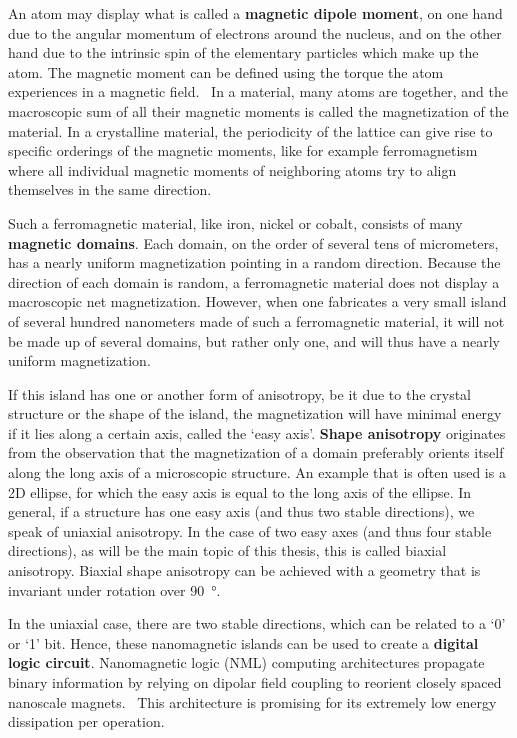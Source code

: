 \documentclass[12pt,a4paper]{article}
\begin{document}
\noindent An atom may display what is called a \textbf{magnetic dipole moment}, on one hand due to the angular momentum of electrons around the nucleus, and on the other hand due to the intrinsic spin of the elementary particles which make up the atom. The magnetic moment can be defined using the torque the atom experiences in a magnetic field.~\cite{IntroMagneticMaterials} In a material, many atoms are together, and the macroscopic sum of all their magnetic moments is called the magnetization of the material. In a crystalline material, the periodicity of the lattice can give rise to specific orderings of the magnetic moments, like for example ferromagnetism where all individual magnetic moments of neighboring atoms try to align themselves in the same direction. \par 
Such a ferromagnetic material, like iron, nickel or cobalt, consists of many \textbf{magnetic domains}. Each domain, on the order of several tens of micrometers, has a nearly uniform magnetization pointing in a random direction. Because the direction of each domain is random, a ferromagnetic material does not display a macroscopic net magnetization. However, when one fabricates a very small island of several hundred nanometers made of such a ferromagnetic material, it will not be made up of several domains, but rather only one, and will thus have a nearly uniform magnetization. \par
If this island has one or another form of anisotropy, be it due to the crystal structure or the shape of the island, the magnetization will have minimal energy if it lies along a certain axis, called the `easy axis'. \textbf{Shape anisotropy} originates from the observation that the magnetization of a domain preferably orients itself along the long axis of a microscopic structure. An example that is often used is a 2D ellipse, for which the easy axis is equal to the long axis of the ellipse. In general, if a structure has one easy axis (and thus two stable directions), we speak of uniaxial anisotropy. In the case of two easy axes (and thus four stable directions), as will be the main topic of this thesis, this is called biaxial anisotropy. Biaxial shape anisotropy can be achieved with a geometry that is invariant under rotation over \SI{90}{\degree}. \par
In the uniaxial case, there are two stable directions, which can be related to a `0' or `1' bit. Hence, these nanomagnetic islands can be used to create a \textbf{digital logic circuit}. Nanomagnetic logic (NML) computing architectures propagate binary information by relying on dipolar field coupling to reorient closely spaced nanoscale magnets.~\cite{SubnanosecondPropagation_AnisotropyChains} This architecture is promising for its extremely low energy dissipation per operation.~\cite{SubnanosecondPropagation_AnisotropyChains,FourStateLogic,MQCA_RoomTemp}
\end{document}

